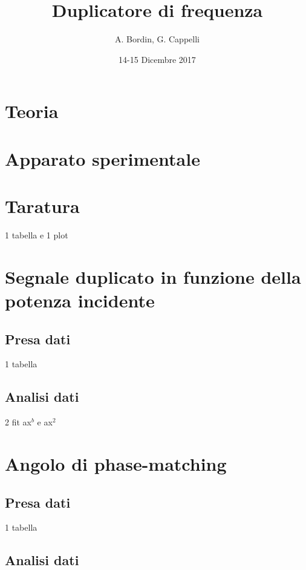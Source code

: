 \documentclass[a4paper]{article}
\author{A. Bordin, G. Cappelli}
\title{Duplicatore di frequenza}
\date{14-15 Dicembre 2017}
\begin{document}
	\maketitle
	
	\begin{abstract}
		 
	\end{abstract}
	
\section{Teoria}

\section{Apparato sperimentale}

\section{Taratura}

1 tabella e 1 plot

\section{Segnale duplicato in funzione della potenza incidente}

\subsection{Presa dati}

1 tabella

\subsection{Analisi dati}

2 fit ax$^b$ e ax$^2$

\section{Angolo di phase-matching}

\subsection{Presa dati}

1 tabella

\subsection{Analisi dati}
\end{document}
